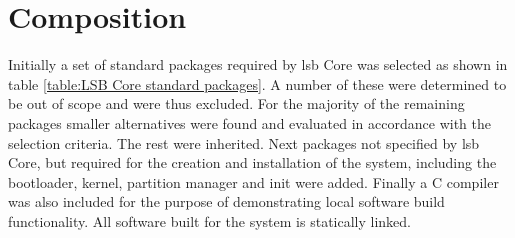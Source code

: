 \section{Composition}\label{Composition}

Initially a set of standard packages required by \gls{lsb} Core was selected as shown in table \ref{table:LSB Core standard packages}. A number of these were determined to be out of scope and were thus excluded. For the majority of the remaining packages smaller alternatives were found and evaluated in accordance with the selection criteria. The rest were inherited. Next packages not specified by \gls{lsb} Core, but required for the creation and installation of the system, including the bootloader, kernel, partition manager and init were added. Finally a C compiler was also included for the purpose of demonstrating local software build functionality. All software built for the system is statically linked.

\newpage

\newpage

\newpage


